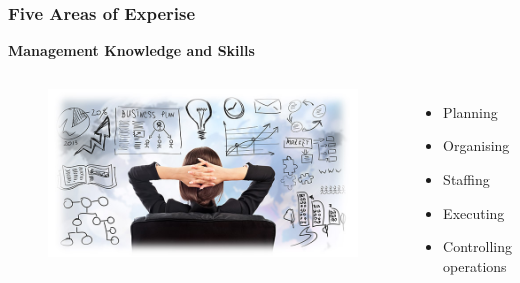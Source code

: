 \documentclass{beamer}
\begin{document}
\begin{frame}
\frametitle{Five Areas of Experise}
\textbf{Management Knowledge and Skills}\\
\vspace{0.5cm}
\begin{columns}[b]
\begin{figure}
\includegraphics[scale=0.23]{management}
\end{figure}
\begin{itemize}
\item Planning
\item Organising
\item Staffing
\item Executing
\item Controlling operations
\end{itemize}
\end{columns}
\end{frame}
\end{document}
